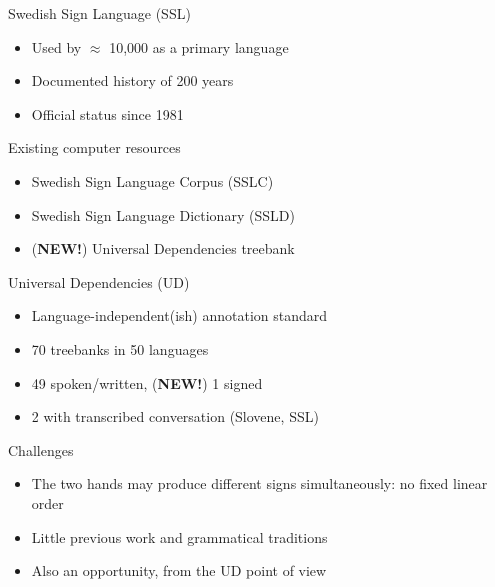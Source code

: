 \documentclass[final]{beamer}
\begin{document}
\begin{frame}{}
    \vfill
    \begin{columns}[t]
        \begin{column}{.48\linewidth}

            \begin{block}{\large Swedish Sign Language (SSL)}
                \begin{itemize}
                    \item Used by $\approx$ 10,000 as a primary language
                    \item Documented history of 200 years
                    \item Official status since 1981
                \end{itemize}
            \end{block}

            \begin{block}{\large Existing computer resources}
                \begin{itemize}
                    \item Swedish Sign Language Corpus (SSLC)
                    \item Swedish Sign Language Dictionary (SSLD)
                    \item (\textbf{NEW!}) Universal Dependencies treebank
                \end{itemize}
            \end{block}

            \begin{block}{\large Universal Dependencies (UD)}
                \begin{itemize}
                    \item Language-independent(ish) annotation standard
                    \item 70 treebanks in 50 languages
                    \item 49 spoken/written, (\textbf{NEW!}) 1 signed
                    \item 2 with transcribed conversation (Slovene, SSL)
                \end{itemize}
            \end{block}

            \begin{block}{\large Challenges}
                \begin{itemize}
                    \item The two hands may produce different signs
                        simultaneously: no fixed linear order
                    \item Little previous work and grammatical traditions
                    \item Also an opportunity, from the UD point of view
                \end{itemize}
            \end{block}



\end{column}
\end{columns}
\end{frame}
\end{document}
